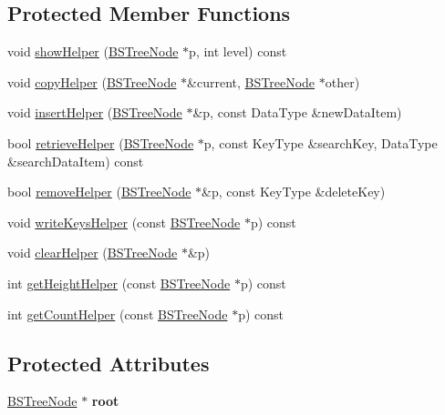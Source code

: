 \subsection*{Protected Member Functions}
\begin{DoxyCompactItemize}
\item 
void \hyperlink{class_b_s_tree_a44b3002e3476eb410468a4b9aaaa73ef}{show\+Helper} (\hyperlink{class_b_s_tree_1_1_b_s_tree_node}{B\+S\+Tree\+Node} $\ast$p, int level) const 
\item 
void \hyperlink{class_b_s_tree_a2833c786ee7ad54bad176d0d44dccf6c}{copy\+Helper} (\hyperlink{class_b_s_tree_1_1_b_s_tree_node}{B\+S\+Tree\+Node} $\ast$\&current, \hyperlink{class_b_s_tree_1_1_b_s_tree_node}{B\+S\+Tree\+Node} $\ast$other)
\item 
void \hyperlink{class_b_s_tree_a03c40a8e81d293f5dbeb4a35eaeb14ca}{insert\+Helper} (\hyperlink{class_b_s_tree_1_1_b_s_tree_node}{B\+S\+Tree\+Node} $\ast$\&p, const Data\+Type \&new\+Data\+Item)
\item 
bool \hyperlink{class_b_s_tree_a071fd2ff13c5ce3af48d46697eaddace}{retrieve\+Helper} (\hyperlink{class_b_s_tree_1_1_b_s_tree_node}{B\+S\+Tree\+Node} $\ast$p, const Key\+Type \&search\+Key, Data\+Type \&search\+Data\+Item) const 
\item 
bool \hyperlink{class_b_s_tree_af9e56aa85b0470c624dec325c780494f}{remove\+Helper} (\hyperlink{class_b_s_tree_1_1_b_s_tree_node}{B\+S\+Tree\+Node} $\ast$\&p, const Key\+Type \&delete\+Key)
\item 
void \hyperlink{class_b_s_tree_a2b949b501d86db3aa1d03b415f26582f}{write\+Keys\+Helper} (const \hyperlink{class_b_s_tree_1_1_b_s_tree_node}{B\+S\+Tree\+Node} $\ast$p) const 
\item 
void \hyperlink{class_b_s_tree_afb5d38809653f67dc423d8a8c6e9e106}{clear\+Helper} (\hyperlink{class_b_s_tree_1_1_b_s_tree_node}{B\+S\+Tree\+Node} $\ast$\&p)
\item 
int \hyperlink{class_b_s_tree_a0c13fd5ffd6a2fd777b7f67a6cf98390}{get\+Height\+Helper} (const \hyperlink{class_b_s_tree_1_1_b_s_tree_node}{B\+S\+Tree\+Node} $\ast$p) const 
\item 
int \hyperlink{class_b_s_tree_ae2e29d4350734ca0721b3907a31803ff}{get\+Count\+Helper} (const \hyperlink{class_b_s_tree_1_1_b_s_tree_node}{B\+S\+Tree\+Node} $\ast$p) const 
\end{DoxyCompactItemize}
\subsection*{Protected Attributes}
\begin{DoxyCompactItemize}
\item 
\hypertarget{class_b_s_tree_a83534afce9094181ac031f9f596a8625}{\hyperlink{class_b_s_tree_1_1_b_s_tree_node}{B\+S\+Tree\+Node} $\ast$ {\bfseries root}}\label{class_b_s_tree_a83534afce9094181ac031f9f596a8625}

\end{DoxyCompactItemize}


